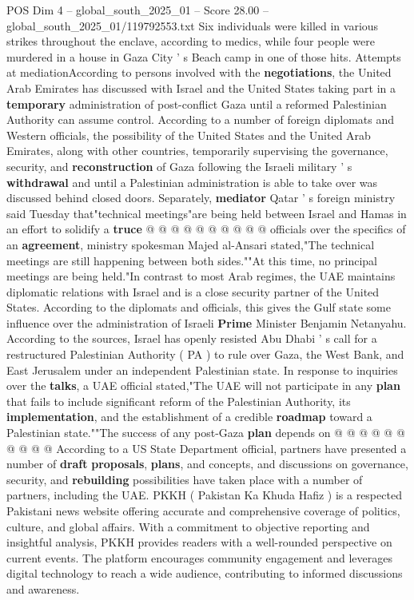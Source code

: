 \begin{textsample}{POS Dim 4 – global\_south\_2025\_01 – Score 28.00 – global\_south\_2025\_01/119792553.txt}
Six individuals were killed in various strikes throughout the enclave, according to medics, while four people were murdered in a house in Gaza City ' s Beach camp in one of those hits.
Attempts at mediationAccording to persons involved with the \textbf{negotiations}, the United Arab Emirates has discussed with Israel and the United States taking part in a \textbf{temporary} administration of post-conflict Gaza until a reformed Palestinian Authority can assume control.
According to a number of foreign diplomats and Western officials, the possibility of the United States and the United Arab Emirates, along with other countries, temporarily supervising the governance, security, and \textbf{reconstruction} of Gaza following the Israeli military ' s \textbf{withdrawal} and until a Palestinian administration is able to take over was discussed behind closed doors.
Separately, \textbf{mediator} Qatar ' s foreign ministry said Tuesday that"technical meetings"are being held between Israel and Hamas in an effort to solidify a \textbf{truce} @ @ @ @ @ @ @ @ @ @ officials over the specifics of an \textbf{agreement}, ministry spokesman Majed al-Ansari stated,"The technical meetings are still happening between both sides.""At this time, no principal meetings are being held."In contrast to most Arab regimes, the UAE maintains diplomatic relations with Israel and is a close security partner of the United States.
According to the diplomats and officials, this gives the Gulf state some influence over the administration of Israeli \textbf{Prime} Minister Benjamin Netanyahu.
According to the sources, Israel has openly resisted Abu Dhabi ' s call for a restructured Palestinian Authority ( PA ) to rule over Gaza, the West Bank, and East Jerusalem under an independent Palestinian state.
In response to inquiries over the \textbf{talks}, a UAE official stated,"The UAE will not participate in any \textbf{plan} that fails to include significant reform of the Palestinian Authority, its \textbf{implementation}, and the establishment of a credible \textbf{roadmap} toward a Palestinian state.""The success of any post-Gaza \textbf{plan} depends on @ @ @ @ @ @ @ @ @ @ According to a US State Department official, partners have presented a number of \textbf{draft} \textbf{proposals}, \textbf{plans}, and concepts, and discussions on governance, security, and \textbf{rebuilding} possibilities have taken place with a number of partners, including the UAE.
PKKH ( Pakistan Ka Khuda Hafiz ) is a respected Pakistani news website offering accurate and comprehensive coverage of politics, culture, and global affairs.
With a commitment to objective reporting and insightful analysis, PKKH provides readers with a well-rounded perspective on current events.
The platform encourages community engagement and leverages digital technology to reach a wide audience, contributing to informed discussions and awareness.


\end{textsample}
